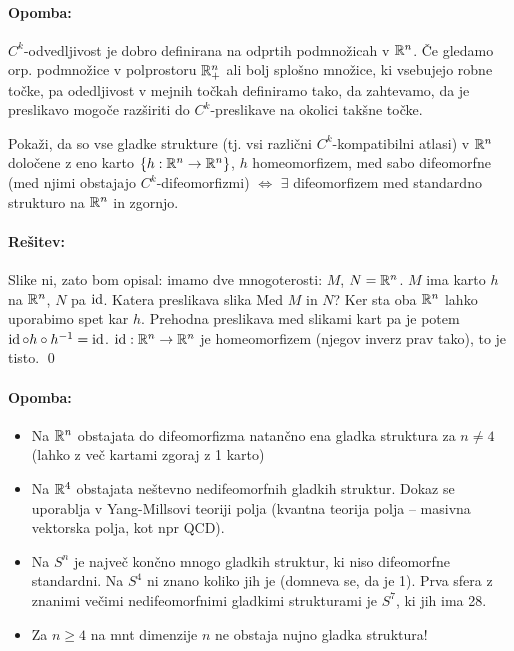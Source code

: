 \paragraph{Opomba:}
$C^k$-odvedljivost je dobro definirana na odprtih podmno\v zicah v $\mathbb{R}^n$. \v Ce gledamo orp. podmno\v zice v polprostoru $\mathbb{R}^n_+$ ali bolj
splo\v sno mno\v zice, ki vsebujejo robne to\v cke, pa odedljivost v mejnih to\v ckah definiramo tako, da zahtevamo, da je preslikavo
mogo\v ce raz\v siriti do $C^k$-preslikave na okolici tak\v sne to\v cke.

\begin{zgled}
	Poka\v zi, da so vse gladke strukture (tj. vsi razli\v cni $C^k$-kompatibilni atlasi) v $\mathbb{R}^n$ dolo\v cene z eno karto
	$\{h : \mathbb{R}^n \to \mathbb{R}^n\}$, $h$ homeomorfizem, med sabo difeomorfne (med njimi obstajajo $C^k$-difeomorfizmi) $\iff$ $\exists$ difeomorfizem
	med standardno strukturo na $\mathbb{R}^n$ in zgornjo.

	\paragraph{Re\v sitev:}
	Slike ni, zato bom opisal: imamo dve mnogoterosti: $M$, $N = \mathbb{R}^n$. $M$ ima karto $h$ na $\mathbb{R}^n$, $N$ pa $\operatorname{id}$. Katera preslikava slika
	Med $M$ in $N$? Ker sta oba $\mathbb{R}^n$ lahko uporabimo spet kar $h$. Prehodna preslikava med slikami kart pa je potem $\operatorname{id} \circ h \circ
	h^{-1} = \operatorname{id}$. $\operatorname{id} : \mathbb{R}^n \to \mathbb{R}^n$ je homeomorfizem (njegov inverz prav tako), to je tisto.
	\qed

	\paragraph{Opomba:}
	\begin{itemize}
		\item{Na $\mathbb{R}^n$ obstajata do difeomorfizma natan\v cno ena gladka struktura za $n \neq 4$ (lahko z ve\v c kartami
			zgoraj z 1 karto)}
		\item{Na $\mathbb{R}^4$ obstajata ne\v stevno nedifeomorfnih gladkih struktur. Dokaz se uporablja v Yang-Millsovi teoriji polja
			(kvantna teorija polja -- masivna vektorska polja, kot npr QCD).}
		\item{Na $S^n$ je najve\v c kon\v cno mnogo gladkih struktur, ki niso difeomorfne standardni. Na $S^4$ ni znano koliko jih
			je (domneva se, da je 1). Prva sfera z znanimi ve\v cimi nedifeomorfnimi gladkimi strukturami je $S^7$, ki jih ima
			28.}
		\item{Za $n \geq 4$ na mnt dimenzije $n$ ne obstaja nujno gladka struktura!}
	\end{itemize}
\end{zgled}

